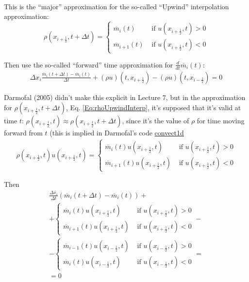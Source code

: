 \documentclass[10pt]{amsart}
\begin{document}
\begin{multicols*}{2}
This is the ``major'' approximation for the so-called ``Upwind'' interpolation approximation:
\begin{equation}\label{Eq:rhoUpwindInterp}
  \rho(x_{i+\frac{1}{2} },t+\Delta t) = \begin{cases} \overline{m}_i(t) & \text{ if } u(x_{i+\frac{1}{2} },t) > 0 \\
    \overline{m}_{i+1}(t) & \text{ if } u(x_{i+\frac{1}{2} },t) < 0
    \end{cases}
\end{equation}

Then use the so-called ``forward'' time approximation for $\frac{d}{dt} \overline{m}_i(t)$:
\[
\begin{gathered}
\Delta x_i \frac{ \overline{m}_i(t+\Delta t) - \overline{m}_i(t) }{ \Delta t} + (\rho u)(t,x_{i+\frac{1}{2} } ) - (\rho u)(t,x_{i-\frac{1}{2} } ) = 0
  \end{gathered}
\]

Darmofal (2005) \cite{Darm2005} didn't make this explicit in Lecture 7, but in the approximation for  $\rho(x_{i+\frac{1}{2} },t+\Delta t)$, Eq. \ref{Eq:rhoUpwindInterp}, it's supposed that it's valid at time $t$: $\rho(x_{i+\frac{1}{2} },t) \approx  \rho(x_{i+\frac{1}{2} },t+\Delta t)$, since it's the value of $\rho$ for time moving forward from $t$ (this is implied in Darmofal's code \href{http://ocw.mit.edu/courses/aeronautics-and-astronautics/16-901-computational-methods-in-aerospace-engineering-spring-2005/lecture-notes/convect1d.m}{convect1d}
\[
\begin{gathered}
  \rho(x_{i+\frac{1}{2} },t)u(x_{i+\frac{1}{2} },t) = \begin{cases} \overline{m}_i(t)u(x_{i+\frac{1}{2} },t) & \text{ if } u(x_{i+\frac{1}{2}},t )>0 \\
    \overline{m}_{i+1}(t)u(x_{i+\frac{1}{2} },t) & \text{ if } u(x_{i+\frac{1}{2}},t )<0
    \end{cases}
  \end{gathered}
\]

Then
\begin{equation}
\begin{gathered}
\frac{ \Delta x_i }{ \Delta t}( \overline{m}_i(t+\Delta t) - \overline{m}_i(t) ) + \\
+ \begin{cases} \overline{m}_i(t)u(x_{i+\frac{1}{2} },t) & \text{ if } u(x_{i+\frac{1}{2}},t )>0 \\
    \overline{m}_{i+1}(t)u(x_{i+\frac{1}{2} },t) & \text{ if } u(x_{i+\frac{1}{2}},t )<0
\end{cases} - \\
- \begin{cases} \overline{m}_{i-1}(t)u(x_{i-\frac{1}{2} },t) & \text{ if } u(x_{i-\frac{1}{2}},t )>0 \\
    \overline{m}_{i}(t)u(x_{i-\frac{1}{2} },t) & \text{ if } u(x_{i-\frac{1}{2}},t )<0
\end{cases} = \\
= 0
  \end{gathered}
  \end{equation}


\end{multicols*}
\end{document}
